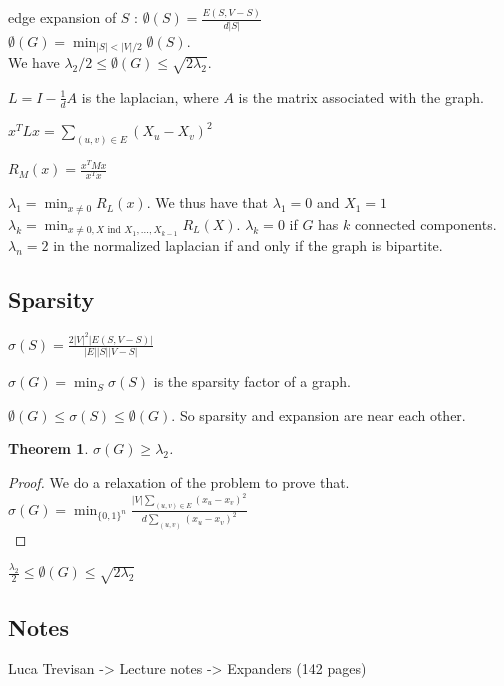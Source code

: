 \documentclass[12pt,a4paper]{article}
\newtheorem{theorem}{Theorem}
\begin{document}
edge expansion of $S$ : $\emptyset(S) = \frac{E(S,V-S)}{d|S|}$\\
$\emptyset(G) = \min_{|S| < |V|/2}\emptyset(S)$.\\
We have $\lambda_2/2 \leq \emptyset(G) \leq \sqrt{2 \lambda_2}$.


$L = I - \frac{1}{d}A$ is the laplacian, where $A$ is the matrix associated with
the graph.

$x^TLx = \sum_{(u,v) \in E}(X_u - X_v)^2$

$R_M(x) = \frac{x^TMx}{x^Tx}$

$\lambda_1 = \min_{x \neq 0} R_L(x)$. We thus have that $\lambda_1 = 0$ and $X_1
= 1$\\

$\lambda_k = \min_{x \neq 0, X \text{ ind } X_1,...,X_{k-1}}R_L(X)$.
$\lambda_k = 0$ if $G$ has $k$ connected components.\\

$\lambda_n = 2$ in the normalized laplacian if and only if the graph is
bipartite.\\

\subsection{Sparsity}

$\sigma(S) = \frac{2|V|^2 |E(S,V-S)|}{|E||S||V-S|}$

$\sigma(G) = \min_S \sigma(S)$ is the sparsity factor of a graph.

$\emptyset(G) \leq \sigma(S) \leq \emptyset(G)$. So sparsity and expansion are
near each other.\\

\begin{theorem}{}{}
  $\sigma(G) \geq \lambda_2$.
\end{theorem}
\begin{proof}
  We do a relaxation of the problem to prove that.\\
  $\sigma(G) = \min_{\{0,1\}^n} \frac{|V|\sum_{(u,v) \in E}(x_u - x_v)^2}{d
    \sum_{(u,v)}(x_u-x_v)^2}$\\
\end{proof}

$\frac{\lambda_2}{2} \leq \emptyset(G) \leq \sqrt{2 \lambda_2}$

\subsection{Notes}

Luca Trevisan -> Lecture notes -> Expanders (142 pages)
\end{document}
